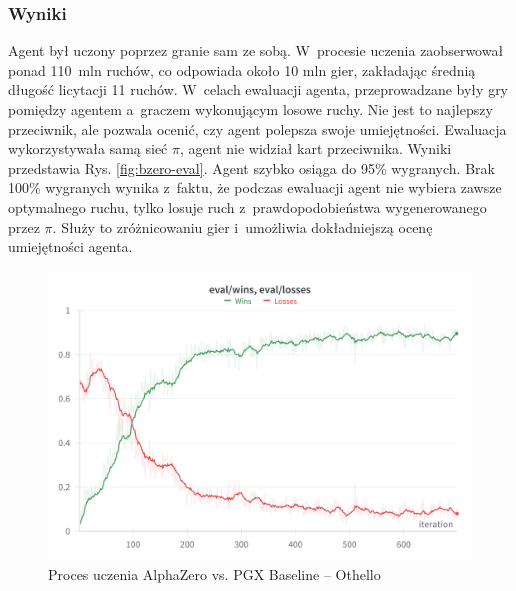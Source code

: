\subsubsection{Wyniki}



Agent był uczony poprzez granie sam ze sobą.
W~procesie uczenia zaobserwował ponad 110~mln ruchów,
co odpowiada około 10 mln gier, zakładając średnią
długość licytacji 11 ruchów.
W~celach ewaluacji agenta, przeprowadzane
były gry pomiędzy agentem a~graczem wykonującym
losowe ruchy.
Nie jest to najlepszy przeciwnik, ale pozwala
ocenić, czy agent polepsza swoje umiejętności.
Ewaluacja wykorzystywała samą sieć $\pi$,
agent nie widział kart przeciwnika.
Wyniki przedstawia Rys. \ref{fig:bzero-eval}.
Agent szybko osiąga do 95\% wygranych.
Brak 100\% wygranych wynika z~faktu, że
podczas ewaluacji agent nie wybiera zawsze optymalnego ruchu,
tylko losuje ruch z~prawdopodobieństwa
wygenerowanego przez $\pi$.
Służy to zróżnicowaniu gier i~umożliwia
dokładniejszą ocenę umiejętności agenta.

\begin{figure}[h!]
  \centering
  \includegraphics[width=\textwidth]{img/wykresy/othello-eval.png}
  \caption{Proces uczenia AlphaZero vs. PGX Baseline -- Othello}
  \label{fig:othello-eval}
\end{figure}

